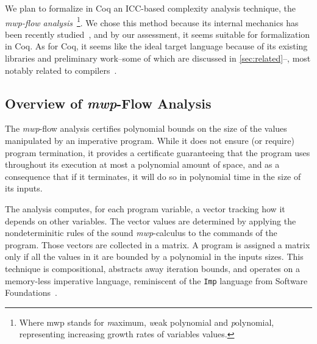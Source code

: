 \documentclass[sigplan,screen,timestamp,%
nonacm]{acmart}
\begin{document}
We plan to formalize in Coq an ICC-based complexity analysis technique, the \emph{mwp-flow analysis}~\cite{Jones2009}\footnote{Where mwp stands for \emph{m}aximum, \emph{w}eak polynomial and \emph{p}olynomial, representing increasing growth rates of variables values.}.
We chose this method because its internal mechanics has been recently studied~\cite{Aubert2022b}, and by our assessment, it seems suitable for formalization in Coq.
As for Coq, it seems like the ideal target language because of its existing libraries and preliminary work--some of which are discussed in \autoref{sec:related}--, most notably related to compilers~\cite{Leroy2009}.

\subsection{Overview of \emph{mwp}-Flow Analysis}
\label{subsec:mwp}

The \emph{mwp}-flow analysis certifies polynomial bounds on the size of the values manipulated by
an imperative program.
While it does not ensure (or require) program termination, it provides a certificate guaranteeing that the program uses throughout its execution at
most a polynomial amount of space, and as a consequence that if it terminates, it will do so in polynomial time in the size of its inputs.

The analysis computes, for each program variable, a vector tracking how it depends on other variables.
The vector values are determined by applying the nondeterminitic rules of the sound \emph{mwp}-calculus to the commands of the program.
Those vectors are collected in a matrix.
A program is assigned a matrix only if all the values in it are bounded by a polynomial in the inputs sizes.
This technique is compositional, abstracts away \eg iteration bounds, and operates on
a memory-less imperative language, reminiscent of the \texttt{Imp} language from Software Foundations~\cite%
{softwarefoundation1}.
\end{document}
